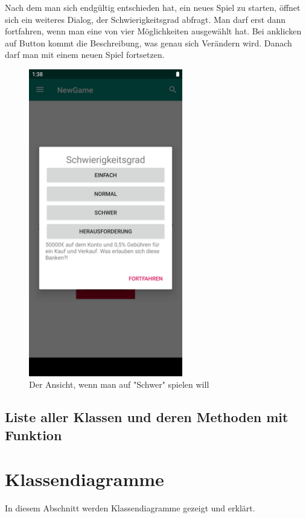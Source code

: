 \documentclass[10pt]{scrartcl}
\begin{document}
Nach dem man sich endgültig entschieden hat, ein neues Spiel zu starten, öffnet sich ein weiteres Dialog, der Schwierigkeitsgrad abfragt. Man darf erst dann fortfahren, wenn man eine von vier Möglichkeiten ausgewählt hat. Bei anklicken auf Button kommt die Beschreibung, was genau sich Verändern wird. Danach darf man mit einem neuen Spiel fortsetzen.

\begin{figure}[H]
	\centering
	\includegraphics[width=0.6\textwidth]{Bilder/Applikation/schwierigkeitsgrad.png}
	\caption{Der Ansicht, wenn man auf "Schwer" spielen will}
\end{figure}

\subsection{Liste aller Klassen und deren Methoden mit Funktion}
\section{Klassendiagramme}
In diesem Abschnitt werden Klassendiagramme gezeigt und erklärt.
\end{document}
